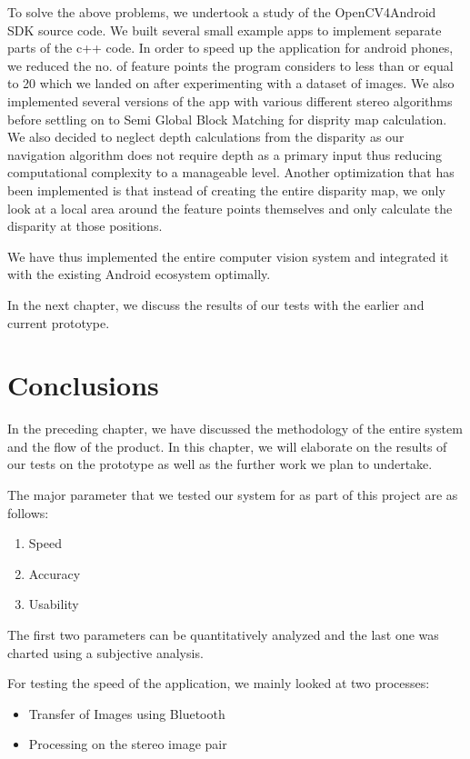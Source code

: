 \documentclass[11pt]{report}
\begin{document}
To solve the above problems, we undertook a study of the OpenCV4Android SDK source code. We built several small example apps to implement separate parts of the c++ code. In order to speed up the application for android phones, we reduced the no. of feature points the program considers to less than or equal to 20 which we landed on after experimenting with a dataset of images. We also implemented several versions of the app with various different stereo algorithms before settling on to Semi Global Block Matching for disprity map calculation. We also decided to neglect depth calculations from the disparity as our navigation algorithm does not require depth as a primary input thus reducing computational complexity to a manageable level. Another optimization that has been implemented is that instead of creating the entire disparity map, we only look at a local area around the feature points themselves and only calculate the disparity at those positions. 

We have thus implemented the entire computer vision system and integrated it with the existing Android ecosystem optimally.    

In the next chapter, we discuss the results of our tests with the earlier and current prototype. 

\chapter{Conclusions}

In the preceding chapter, we have discussed the methodology of the entire system and the flow of the product. In this chapter, we will elaborate on the results of our tests on the prototype as well as the further work we plan to undertake. 

The major parameter that we tested our system for as part of this project are as follows:

\begin{enumerate}
\item Speed 
\item Accuracy 
\item Usability 
\end{enumerate}

The first two parameters can be quantitatively analyzed and the last one was charted using  a subjective analysis. 

For testing the speed of the application, we mainly looked at two processes:
\begin{itemize}
\item Transfer of Images using Bluetooth
\item Processing on the stereo image pair
\end{itemize}
\end{document}
